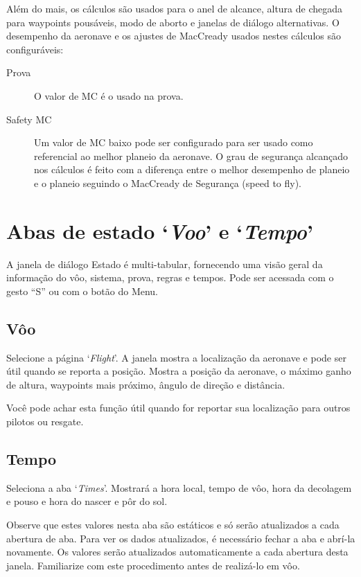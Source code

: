 Além do mais, os cálculos são usados para o anel de alcance, altura de chegada para waypoints pousáveis, modo de aborto e janelas de diálogo alternativas.  O desempenho da aeronave e os ajustes de MacCready usados nestes cálculos são configuráveis:
\begin{description}
\item[Prova] O valor de MC é o usado na prova.
\item[Safety MC] Um valor de MC baixo pode ser configurado para ser usado como referencial ao melhor planeio da aeronave.  O grau de segurança alcançado nos cálculos é feito com a diferença entre o melhor desempenho de planeio e o planeio seguindo o MacCready de Segurança (speed to fly).  
\end{description}

\section{Abas de estado `{\it Voo}' e `{\it Tempo}'}\label{sec:flight-status}

A janela de diálogo Estado é multi-tabular, fornecendo uma visão geral da informação do vôo, sistema, prova, regras e tempos.  Pode ser acessada com o gesto “S” ou com o botão do Menu. 
\begin{quote}
\blink{}
\end{quote}

\subsection*{Vôo}
Selecione a página `{\it Flight}'. 
A janela mostra a localização da aeronave e pode ser útil quando se reporta a posição.  Mostra a posição da aeronave, o máximo ganho de altura, waypoints mais próximo, ângulo de direção e distância.

Você pode achar esta função útil quando for reportar sua localização para outros pilotos ou resgate.

\subsection*{Tempo}\label{sec:time-status}
Seleciona a aba  `{\it Times}'. 
Mostrará a hora local, tempo de vôo, hora da decolagem e pouso e hora do nascer e pôr do sol.

Observe que estes valores nesta aba são estáticos e só serão atualizados a cada abertura de aba. 
Para ver os dados atualizados, é necessário fechar a aba e abrí-la novamente.  Os valores serão atualizados automaticamente a cada abertura desta janela.  Familiarize com este procedimento antes de realizá-lo em vôo.


